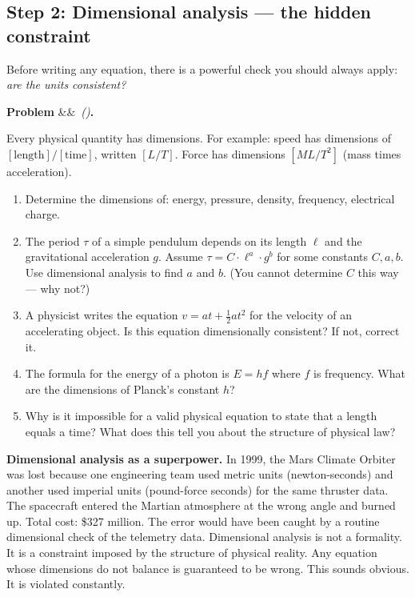 \documentclass[12pt, a4paper]{article}
\newcounter{problem}
\newenvironment{problem}[1][]{%
  \refstepcounter{problem}%
  \par\vspace{6pt}%
  \noindent\textbf{\color{MidBlue}Problem \theproblem}%
  \ifx&#1&\else\ \textit{(#1)}\fi\textbf{.}\enskip
}{\par\vspace{4pt}}
\begin{document}
\subsection{Step 2: Dimensional analysis --- the hidden constraint}

Before writing any equation, there is a powerful check you should always apply: \emph{are the units consistent?}

\begin{problem}
\label{prob:dimensions}
Every physical quantity has dimensions. For example: speed has dimensions of $[\text{length}]/[\text{time}]$, written $[L/T]$. Force has dimensions $[M L / T^2]$ (mass times acceleration).
\begin{enumerate}[label=(\alph*), topsep=2pt]
  \item Determine the dimensions of: energy, pressure, density, frequency, electrical charge.
  \item The period $\tau$ of a simple pendulum depends on its length $\ell$ and the gravitational acceleration $g$. Assume $\tau = C \cdot \ell^a \cdot g^b$ for some constants $C, a, b$. Use dimensional analysis to find $a$ and $b$. (You cannot determine $C$ this way --- why not?)
  \item A physicist writes the equation $v = at + \frac{1}{2}at^2$ for the velocity of an accelerating object. Is this equation dimensionally consistent? If not, correct it.
  \item The formula for the energy of a photon is $E = hf$ where $f$ is frequency. What are the dimensions of Planck's constant $h$?
  \item Why is it impossible for a valid physical equation to state that a length equals a time? What does this tell you about the structure of physical law?
\end{enumerate}
\end{problem}

\begin{thought}
\textbf{Dimensional analysis as a superpower.}
In 1999, the Mars Climate Orbiter was lost because one engineering team used metric units (newton-seconds) and another used imperial units (pound-force seconds) for the same thruster data. The spacecraft entered the Martian atmosphere at the wrong angle and burned up. Total cost: \$327 million. The error would have been caught by a routine dimensional check of the telemetry data. Dimensional analysis is not a formality. It is a constraint imposed by the structure of physical reality. Any equation whose dimensions do not balance is guaranteed to be wrong. This sounds obvious. It is violated constantly.
\end{thought}
\end{document}
